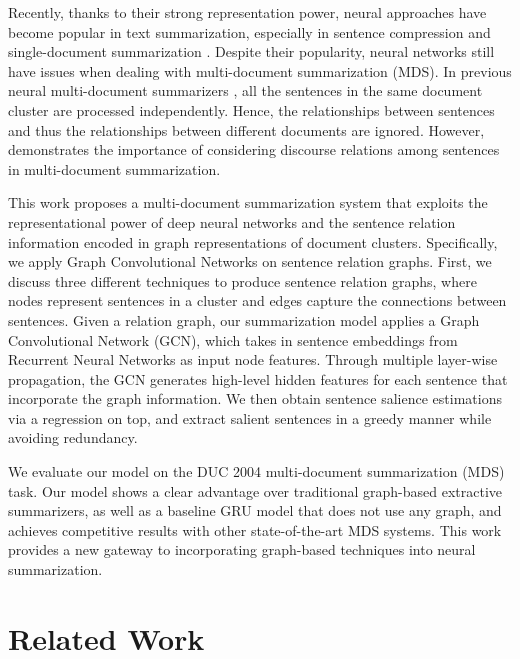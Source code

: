 \documentclass[11pt,a4paper]{article}
\begin{document}
Recently, thanks to their strong representation power, neural approaches have become popular in text summarization, especially in sentence compression \cite{rush2015neural} and single-document summarization \cite{cheng2016neural}.
Despite their popularity, neural networks still have issues when dealing with multi-document summarization (MDS).
In previous neural multi-document summarizers \cite{cao2015ranking,cao2017improving}, 
all the sentences in the same document cluster are processed independently.
Hence, the relationships between sentences and thus the relationships between  different documents are ignored. 
However,  demonstrates the importance of considering discourse relations among sentences in multi-document summarization.
 
This work proposes a multi-document summarization system that exploits the representational power of deep neural networks and the sentence relation information encoded in graph representations of document clusters.
Specifically, we apply Graph Convolutional Networks \cite{kipf2017semi} on sentence relation graphs.
First, we discuss three different
techniques to produce sentence relation graphs, where
nodes represent sentences in a cluster and edges capture the connections between sentences.
Given a relation graph,
our summarization model applies a Graph Convolutional Network (GCN), which takes in sentence embeddings from Recurrent Neural Networks as input node features.
Through multiple layer-wise propagation, the GCN generates high-level hidden features for each sentence that incorporate the graph information.
We then obtain sentence salience estimations via a regression on top, and extract salient sentences in a greedy manner while avoiding redundancy.

We evaluate our model on the DUC 2004 multi-document summarization (MDS) task.
Our model shows a clear advantage over traditional graph-based extractive summarizers, as well as a baseline GRU model that does not use any graph, and achieves competitive results with other state-of-the-art MDS systems.
This work provides a new gateway to incorporating graph-based techniques into neural summarization.
 
\section{Related Work}
\end{document}
